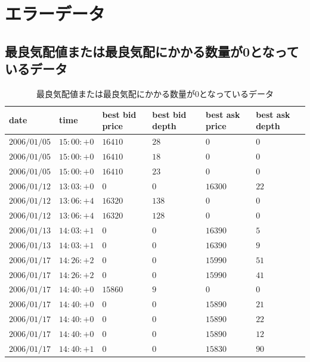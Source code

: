 \documentclass[a4j,papersize,disablejfam,slide,14pt]{jsarticle}
\begin{document}
\section{エラーデータ}
\label{sec:appendix_errordata}
	\begin{description}
\subsection{最良気配値または最良気配にかかる数量が0となっているデータ}
            \begin{center}
            \scriptsize
            \begin{longtable}{|l|l|l|l|l|l|}
                \caption{最良気配値または最良気配にかかる数量が0となっているデータ} \\ \hline
                	{\rm date} & {\rm time} & {\rm best bid price} & {\rm best bid depth} & {\rm best ask price} & {\rm best ask depth} \\ \hline
					$2006/01/05$ & $15:00:+0$ & $16410$ & $28$ & $0$ & $0$ \\ \hline
					$2006/01/05$ & $15:00:+0$  & $16410$ & $18$ & $0$ & $0$ \\ \hline
					$2006/01/05$ & $15:00:+0$  & $16410$ & $23$ & $0$ & $0$ \\ \hline
					$2006/01/12$ & $13:03:+0$  & $0$ & $0$ & $16300$ & $22$ \\ \hline
					$2006/01/12$ & $13:06:+4$  & $16320$ & $138$ & $0$ & $0$ \\ \hline
					$2006/01/12$ & $13:06:+4$  & $16320$ & $128$ & $0$ & $0$ \\ \hline
					$2006/01/13$ & $14:03:+1$  & $0$ & $0$ & $16390$ & $5$ \\ \hline
					$2006/01/13$ & $14:03:+1$  & $0$ & $0$ & $16390$ & $9$ \\ \hline
					$2006/01/17$ & $14:26:+2$  & $0$ & $0$ & $15990$ & $51$ \\ \hline
					$2006/01/17$ & $14:26:+2$  & $0$ & $0$ & $15990$ & $41$ \\ \hline
					$2006/01/17$ & $14:40:+0$  & $15860$ & $9$ & $0$ & $0$ \\ \hline
					$2006/01/17$ & $14:40:+0$  & $0$ & $0$ & $15890$ & $21$ \\ \hline
					$2006/01/17$ & $14:40:+0$  & $0$ & $0$ & $15890$ & $22$ \\ \hline
					$2006/01/17$ & $14:40:+0$  & $0$ & $0$ & $15890$ & $12$ \\ \hline
					$2006/01/17$ & $14:40:+1$  & $0$ & $0$ & $15830$ & $90$ \\ \hline

\end{longtable}
\end{center}
\end{description}
\end{document}
